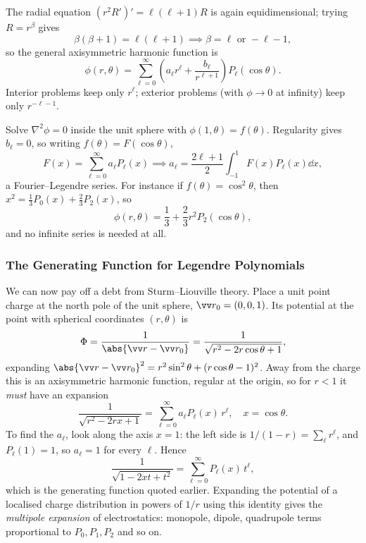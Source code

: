 The radial equation $(r^2 R')' = \ell(\ell+1) R$ is again equidimensional; trying $R = r^\beta$ gives
$$
\beta(\beta + 1) = \ell (\ell + 1) \implies \beta = \ell \text{ or } -\ell - 1,
$$
so the general axisymmetric harmonic function is
$$
\phi(r, \theta) = \sum_{\ell = 0}^{\infty}\left(a_\ell r^\ell + \frac{b_\ell}{r^{\ell + 1}}\right) P_\ell(\cos \theta).
$$
Interior problems keep only $r^\ell$; exterior problems (with $\phi \rightarrow 0$ at infinity) keep only $r^{-\ell - 1}$.

\begin{example}
    Solve $\nabla^2 \phi = 0$ inside the unit sphere with $\phi(1, \theta) = f(\theta)$. Regularity gives $b_\ell = 0$, so writing $f(\theta) = F(\cos\theta)$,
    $$
    F(x) = \sum_{\ell = 0}^{\infty} a_\ell P_\ell(x) \implies a_\ell = \frac{2 \ell + 1}{2}\int_{-1}^{1} F(x) P_\ell(x) \dd x,
    $$
    a Fourier--Legendre series. For instance if $f(\theta) = \cos^2\theta$, then $x^2 = \frac{1}{3}P_0(x) + \frac{2}{3} P_2(x)$, so
    $$
    \phi(r, \theta) = \frac{1}{3} + \frac{2}{3} r^2 P_2(\cos\theta),
    $$
    and no infinite series is needed at all.
\end{example}

\subsubsection*{The Generating Function for Legendre Polynomials}

We can now pay off a debt from Sturm--Liouville theory. Place a unit point charge at the north pole of the unit sphere, $\vv r_0 = (0, 0, 1)$. Its potential at the point with spherical coordinates $(r, \theta)$ is
$$
\Phi = \frac{1}{\abs{\vv r - \vv r_0}} = \frac{1}{\sqrt{r^2 - 2 r \cos \theta + 1}},
$$
expanding $\abs{\vv r - \vv r_0}^2 = r^2 \sin^2 \theta + (r\cos\theta - 1)^2$. Away from the charge this is an axisymmetric harmonic function, regular at the origin, so for $r < 1$ it \emph{must} have an expansion
$$
\frac{1}{\sqrt{r^2 - 2r x + 1}} = \sum_{\ell = 0}^{\infty} a_\ell P_\ell(x)\, r^\ell, \quad x = \cos \theta.
$$
To find the $a_\ell$, look along the axis $x = 1$: the left side is $1/(1 - r) = \sum_\ell r^\ell$, and $P_\ell(1) = 1$, so $a_\ell = 1$ for every $\ell$. Hence
$$
\frac{1}{\sqrt{1 - 2xt + t^2}} = \sum_{\ell = 0}^{\infty} P_\ell(x)\, t^\ell,
$$
which is the generating function quoted earlier. Expanding the potential of a localised charge distribution in powers of $1/r$ using this identity gives the \emph{multipole expansion} of electrostatics: monopole, dipole, quadrupole terms proportional to $P_0, P_1, P_2$ and so on.

